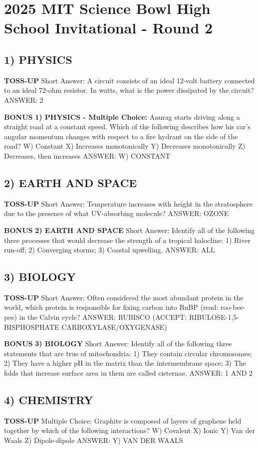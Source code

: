 \documentclass{article}
\begin{document}
\section*{2025 MIT Science Bowl High School Invitational - Round 2}

\subsection*{1) PHYSICS}
\textbf{TOSS-UP}
Short Answer: A circuit consists of an ideal 12-volt battery connected to an ideal 72-ohm resistor. In watts, what is the power dissipated by the circuit?
ANSWER: 2

\textbf{BONUS}
\textbf{1) PHYSICS - Multiple Choice:} Anurag starts driving along a straight road at a constant speed. Which of the following describes how his car's angular momentum changes with respect to a fire hydrant on the side of the road?
W) Constant
X) Increases monotonically
Y) Decreases monotonically
Z) Decreases, then increases
ANSWER: W) CONSTANT

\subsection*{2) EARTH AND SPACE}
\textbf{TOSS-UP}
Short Answer: Temperature increases with height in the stratosphere due to the presence of what UV-absorbing molecule?
ANSWER: OZONE

\textbf{BONUS}
\textbf{2) EARTH AND SPACE}
Short Answer: Identify all of the following three processes that would decrease the strength of a tropical halocline: 1) River run-off; 2) Converging storms; 3) Coastal upwelling.
ANSWER: ALL

\subsection*{3) BIOLOGY}
\textbf{TOSS-UP}
Short Answer: Often considered the most abundant protein in the world, which protein is responsible for fixing carbon into RuBP (read: roo-bee-pee) in the Calvin cycle?
ANSWER: RUBISCO (ACCEPT: RIBULOSE-1,5-BISPHOSPHATE CARBOXYLASE/OXYGENASE)

\textbf{BONUS}
\textbf{3) BIOLOGY}
Short Answer: Identify all of the following three statements that are true of mitochondria: 1) They contain circular chromosomes; 2) They have a higher pH in the matrix than the intermembrane space; 3) The folds that increase surface area in them are called cisternae.
ANSWER: 1 AND 2

\subsection*{4) CHEMISTRY}
\textbf{TOSS-UP}
Multiple Choice: Graphite is composed of layers of graphene held together by which of the following interactions?
W) Covalent
X) Ionic
Y) Van der Waals
Z) Dipole-dipole
ANSWER: Y) VAN DER WAALS
\end{document}
